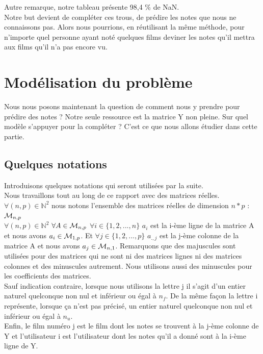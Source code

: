 \documentclass[a4paper,10pt]{article}
\begin{document}
Autre remarque, notre tableau présente 98,4 \% de NaN.\\

Notre but devient de compléter ces trous, de prédire les notes que nous ne connaissons pas. Alors nous pourrions, en réutilisant la même méthode, pour n'importe quel personne ayant noté quelques films deviner les notes qu'il mettra aux films qu'il n'a pas encore vu.

\section{Modélisation du problème}

Nous nous posons maintenant la question de comment nous y prendre pour prédire des notes ?
Notre seule ressource est la matrice Y non pleine. Sur quel modèle s'appuyer pour la compléter ?
C'est ce que nous allons étudier dans cette partie.

\subsection{Quelques notations}

Introduisons quelques notations qui seront utilisées par la suite.\\

Nous travaillons tout au long de ce rapport avec des matrices réelles. $\forall (n, p) \in \mathbb{N}^2$ nous notons l'ensemble des matrices réelles de dimension $n * p$ : ${\cal M}_{n, p}$\\
$\forall (n, p) \in \mathbb{N}^2$ $\forall A \in {\cal M}_{n, p}$ $\forall i \in \{1, 2, ..., n\}$ $a_i$ est la i-ème ligne de la matrice A et nous avons $a_i \in {\cal M}_{1, p}$. Et $\forall j \in \{1, 2, ..., p\}$ $a_{., j}$ est la j-ème colonne de la matrice A et nous avons $a_j \in {\cal M}_{n, 1}$. Remarquons que des majuscules sont utilisées pour des matrices qui ne sont ni des matrices lignes ni des matrices colonnes et des minuscules autrement. Nous utilisons aussi des minuscules pour les coefficients des matrices.\\
Sauf indication contraire, lorsque nous utilisons la lettre j il s'agit d'un entier naturel quelconque non nul et inférieur ou égal à $n_f$. De la même façon la lettre i représente, lorsque ça n'est pas précisé, un entier naturel quelconque non nul et inférieur ou égal à $n_u$.\\
Enfin, le film numéro j est le film dont les notes se trouvent à la j-ème colonne de Y et l'utilisateur i est l'utilisateur dont les notes qu'il a donné sont à la i-ème ligne de Y.
\end{document}
